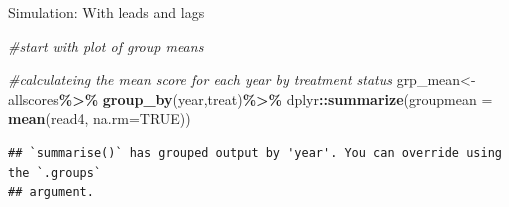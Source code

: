 \documentclass[
  ignorenonframetext,
]{beamer}
\newenvironment{Shaded}{\begin{snugshade}}{\end{snugshade}}
\newcommand{\AttributeTok}[1]{\textcolor[rgb]{0.13,0.29,0.53}{#1}}
\newcommand{\CommentTok}[1]{\textcolor[rgb]{0.56,0.35,0.01}{\textit{#1}}}
\newcommand{\ConstantTok}[1]{\textcolor[rgb]{0.56,0.35,0.01}{#1}}
\newcommand{\DecValTok}[1]{\textcolor[rgb]{0.00,0.00,0.81}{#1}}
\newcommand{\FunctionTok}[1]{\textcolor[rgb]{0.13,0.29,0.53}{\textbf{#1}}}
\newcommand{\NormalTok}[1]{#1}
\newcommand{\OtherTok}[1]{\textcolor[rgb]{0.56,0.35,0.01}{#1}}
\newcommand{\SpecialCharTok}[1]{\textcolor[rgb]{0.81,0.36,0.00}{\textbf{#1}}}
\newcommand{\StringTok}[1]{\textcolor[rgb]{0.31,0.60,0.02}{#1}}
\begin{document}
\begin{frame}[fragile]{Simulation: With leads and lags}
\protect\hypertarget{simulation-with-leads-and-lags-4}{}
\tiny

\begin{Shaded}
\begin{Highlighting}[]
\CommentTok{\#start with plot of group means}

\CommentTok{\#calculateing the mean score for each year by treatment status}
\NormalTok{grp\_mean}\OtherTok{\textless{}{-}}\NormalTok{allscores}\SpecialCharTok{\%\textgreater{}\%}
    \FunctionTok{group\_by}\NormalTok{(year,treat)}\SpecialCharTok{\%\textgreater{}\%}
\NormalTok{    dplyr}\SpecialCharTok{::}\FunctionTok{summarize}\NormalTok{(}\AttributeTok{groupmean =} \FunctionTok{mean}\NormalTok{(read4, }\AttributeTok{na.rm=}\ConstantTok{TRUE}\NormalTok{))}
\end{Highlighting}
\end{Shaded}

\begin{verbatim}
## `summarise()` has grouped output by 'year'. You can override using the `.groups`
## argument.
\end{verbatim}

\begin{Shaded}
\end{Shaded}
\end{frame}
\end{document}
